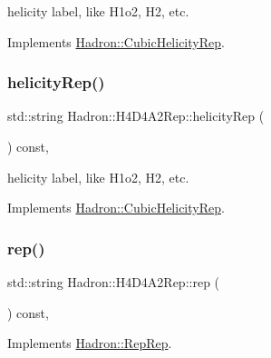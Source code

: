 helicity label, like H1o2, H2, etc. 

Implements \mbox{\hyperlink{structHadron_1_1CubicHelicityRep_af1096946b7470edf0a55451cc662f231}{Hadron\+::\+Cubic\+Helicity\+Rep}}.

\mbox{\label{structHadron_1_1H4D4A2Rep_a6f131b590922aebb01c15d0f9a0b9d1b}} 
\subsubsection{\texorpdfstring{helicityRep()}{helicityRep()}\hspace{0.1cm}{\footnotesize\ttfamily [2/2]}}
{\footnotesize\ttfamily std\+::string Hadron\+::\+H4\+D4\+A2\+Rep\+::helicity\+Rep (\begin{DoxyParamCaption}{ }\end{DoxyParamCaption}) const\hspace{0.3cm}{\ttfamily [inline]}, {\ttfamily [virtual]}}

helicity label, like H1o2, H2, etc. 

Implements \mbox{\hyperlink{structHadron_1_1CubicHelicityRep_af1096946b7470edf0a55451cc662f231}{Hadron\+::\+Cubic\+Helicity\+Rep}}.

\mbox{\label{structHadron_1_1H4D4A2Rep_a3964a2a2df9370ac3176d54fa588eb8a}} 
\subsubsection{\texorpdfstring{rep()}{rep()}\hspace{0.1cm}{\footnotesize\ttfamily [1/3]}}
{\footnotesize\ttfamily std\+::string Hadron\+::\+H4\+D4\+A2\+Rep\+::rep (\begin{DoxyParamCaption}{ }\end{DoxyParamCaption}) const\hspace{0.3cm}{\ttfamily [inline]}, {\ttfamily [virtual]}}



Implements \mbox{\hyperlink{structHadron_1_1RepRep_ab3213025f6de249f7095892109575fde}{Hadron\+::\+Rep\+Rep}}.

\mbox{\label{structHadron_1_1H4D4A2Rep_a3964a2a2df9370ac3176d54fa588eb8a}} 
